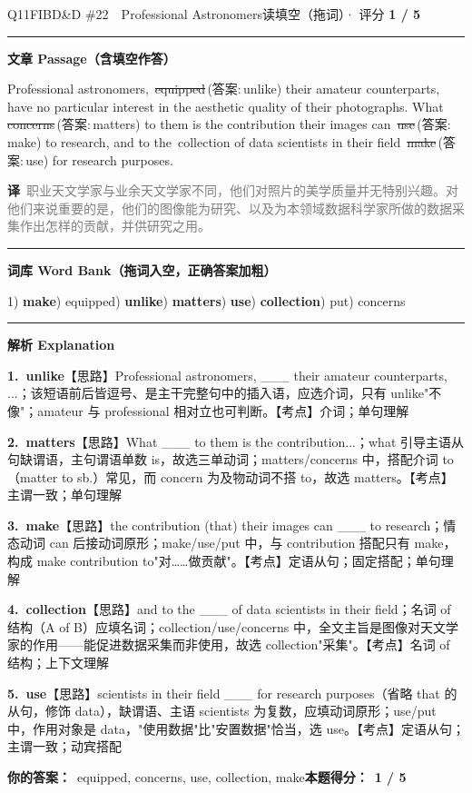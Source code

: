 \documentclass[11pt]{article}
\newcommand{\ptesub}[1]{%
  \par\needspace{2\baselineskip}\smallskip
  {\color{cAccent}\rule[-0.2ex]{3pt}{1.05em}}\hspace{6pt}%
  {\bfseries\color{cHead}#1}\par\nopagebreak\smallskip}
\newcommand{\zh}[1]{{\footnotesize\textcolor{cNote}{\textbf{译}}\ \textcolor{gray}{#1}}}
\newcommand{\rok}[1]{{\color{cFix}\ding{51}\,#1}}                 %
\newcommand{\rno}[2]{{\color{cWrong}\ding{55}\,\sout{#1}}\,{\footnotesize\color{cFix}(答案:\,#2)}}  %
\begin{document}
\begin{qblock}{Q11\quad FIBD\&D \#22\ \ Professional Astronomers}{读填空（拖词）· 评分 \textcolor{cAccent}{\bfseries 1 / 5}}
\ptesub{文章 Passage（含填空作答）}
\begin{promptbox}
Professional astronomers, \rno{equipped}{unlike} their amateur counterparts, have no particular interest in the aesthetic quality of their photographs. What \rno{concerns}{matters} to them is the contribution their images can \rno{use}{make} to research, and to the \rok{collection} of data scientists in their field \rno{make}{use} for research purposes.
\end{promptbox}
\zh{职业天文学家与业余天文学家不同，他们对照片的美学质量并无特别兴趣。对他们来说重要的是，他们的图像能为研究、以及为本领域数据科学家所做的数据采集作出怎样的贡献，并供研究之用。}
\ptesub{词库 Word Bank（拖词入空，正确答案加粗）}
{\small 1) \textbf{make}) equipped) \textbf{unlike}) \textbf{matters}) \textbf{use}) \textbf{collection}) put) concerns}
\ptesub{解析 Explanation}
\begin{notebox}\footnotesize
\textbf{1.\ unlike}\quad【思路】Professional astronomers, \_\_\_ their amateur counterparts, ...；该短语前后皆逗号、是主干完整句中的插入语，应选介词，只有 unlike"不像"；amateur 与 professional 相对立也可判断。【考点】介词；单句理解\par\smallskip
\textbf{2.\ matters}\quad【思路】What \_\_\_ to them is the contribution...；what 引导主语从句缺谓语，主句谓语单数 is，故选三单动词；matters/concerns 中，搭配介词 to（matter to sb.）常见，而 concern 为及物动词不搭 to，故选 matters。【考点】主谓一致；单句理解\par\smallskip
\textbf{3.\ make}\quad【思路】the contribution (that) their images can \_\_\_ to research；情态动词 can 后接动词原形；make/use/put 中，与 contribution 搭配只有 make，构成 make contribution to"对……做贡献"。【考点】定语从句；固定搭配；单句理解\par\smallskip
\textbf{4.\ collection}\quad【思路】and to the \_\_\_ of data scientists in their field；名词 of 结构（A of B）应填名词；collection/use/concerns 中，全文主旨是图像对天文学家的作用——能促进数据采集而非使用，故选 collection"采集"。【考点】名词 of 结构；上下文理解\par\smallskip
\textbf{5.\ use}\quad【思路】scientists in their field \_\_\_ for research purposes（省略 that 的从句，修饰 data），缺谓语、主语 scientists 为复数，应填动词原形；use/put 中，作用对象是 data，"使用数据"比"安置数据"恰当，选 use。【考点】定语从句；主谓一致；动宾搭配
\end{notebox}
\smallskip
\textbf{你的答案：}\ {\color{cWrong}equipped, concerns, use}, collection, {\color{cWrong}make}\qquad\textbf{本题得分：}\ {\color{cAccent}\bfseries 1 / 5}
\end{qblock}
\end{document}
